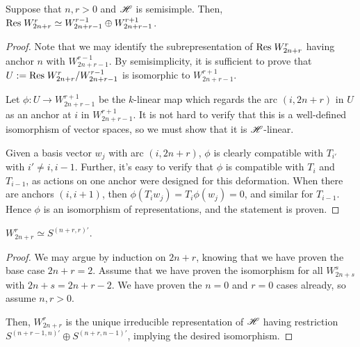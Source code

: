 \documentclass{amsart}
\begin{document}
\begin{proposition}
  Suppose that $n,r > 0$ and $\mathscr{H}$ is semisimple.
  Then, $\text{Res} \; W_{2n + r}^r \simeq W_{2n + r - 1}^{r-1} \oplus W_{2n + r - 1}^{r + 1}$.
\end{proposition}
\begin{proof}
  Note that we may identify the subrepresentation of $\text{Res} \; W_{2n + r}^r$ having anchor $n$ with $W_{2n + r - 1}^{r-1}$.
  By semisimplicity, it is sufficient to prove that $U := \text{Res} \; W_{2n + r}^r / W_{2n + r - 1}^{r-1}$ is isomorphic to $W_{2n + r - 1}^{r +1}$.

  Let $\phi:U \rightarrow W_{2n + r - 1}^{r + 1}$ be the $k$-linear map which regards the arc $(i,2n + r)$ in $U$ as an anchor at $i$ in $W_{2n + r - 1}^{r + 1}$.
  It is not hard to verify that this is a well-defined isomorphism of vector spaces, so we must show that it is $\mathscr{H}$-linear.

  Given a basis vector $w_j$ with arc $(i,2n + r)$, $\phi$ is clearly compatible with $T_{i'}$ with $i' \neq i,i-1$.
  Further, it's easy to verify that $\phi$ is compatible with $T_{i}$ and $T_{i-1}$, as actions on one anchor were designed for this deformation.
  When there are anchors $(i,i+1)$, then $\phi(T_iw_j) = T_i\phi(w_j) = 0$, and similar for $T_{i -1}$.
  Hence $\phi$ is an isomorphism of representations, and the statement is proven.
\end{proof}

\begin{corollary}
  $W_{2n + r}^r \simeq S^{(n + r,r)'}$.
\end{corollary}
\begin{proof}
  We may argue by induction on $2n + r$, knowing that we have proven the base case $2n + r = 2$.
  Assume that we have proven the isomorphism for all $W_{2n + s}^{s}$ with $2n + s = 2n + r - 2$.
  We have proven the $n = 0$ and $r = 0$ cases already, so assume $n,r > 0$.
  
  Then, $W_{2n + r}^{r}$ is the unique irreducible representation of $\mathscr{H}$ having restriction $S^{(n+r-1,n)'} \oplus S^{(n + r,n-1)'}$, implying the desired isomorphism.
\end{proof}
\end{document}
